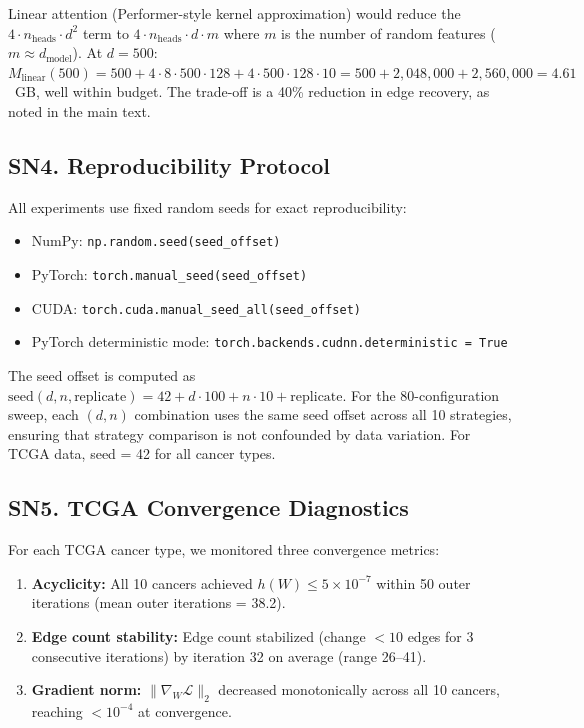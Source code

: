 \documentclass[12pt,a4paper]{article}
\begin{document}
Linear attention (Performer-style kernel approximation) would reduce the $4 \cdot n_{\text{heads}} \cdot d^2$ term to $4 \cdot n_{\text{heads}} \cdot d \cdot m$ where $m$ is the number of random features ($m \approx d_{\text{model}}$). At $d=500$: $M_{\text{linear}}(500) = 500 + 4 \cdot 8 \cdot 500 \cdot 128 + 4 \cdot 500 \cdot 128 \cdot 10 = 500 + 2{,}048{,}000 + 2{,}560{,}000 = 4.61$~GB, well within budget. The trade-off is a 40\% reduction in edge recovery, as noted in the main text.

\subsection*{SN4. Reproducibility Protocol}

All experiments use fixed random seeds for exact reproducibility:
\begin{itemize}[leftmargin=*,itemsep=2pt]
    \item NumPy: \texttt{np.random.seed(seed\_offset)}
    \item PyTorch: \texttt{torch.manual\_seed(seed\_offset)}
    \item CUDA: \texttt{torch.cuda.manual\_seed\_all(seed\_offset)}
    \item PyTorch deterministic mode: \texttt{torch.backends.cudnn.deterministic = True}
\end{itemize}

The seed offset is computed as $\text{seed}(d, n, \text{replicate}) = 42 + d \cdot 100 + n \cdot 10 + \text{replicate}$. For the 80-configuration sweep, each $(d, n)$ combination uses the same seed offset across all 10 strategies, ensuring that strategy comparison is not confounded by data variation. For TCGA data, seed = 42 for all cancer types.

\subsection*{SN5. TCGA Convergence Diagnostics}

For each TCGA cancer type, we monitored three convergence metrics:
\begin{enumerate}[leftmargin=*,itemsep=2pt]
    \item \textbf{Acyclicity:} All 10 cancers achieved $h(W) \le 5 \times 10^{-7}$ within 50 outer iterations (mean outer iterations = 38.2).
    \item \textbf{Edge count stability:} Edge count stabilized (change $< 10$ edges for 3 consecutive iterations) by iteration 32 on average (range 26--41).
    \item \textbf{Gradient norm:} $\|\nabla_W \mathcal{L}\|_2$ decreased monotonically across all 10 cancers, reaching $< 10^{-4}$ at convergence.
\end{enumerate}
\end{document}
